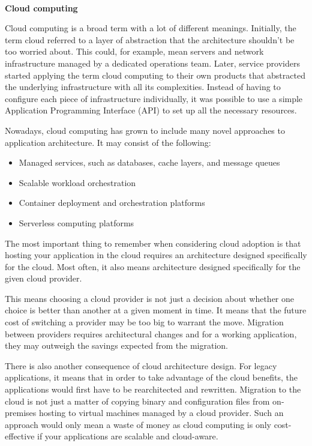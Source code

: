\hspace*{\fill} \\ %
\noindent
\textbf{Cloud computing}

Cloud computing is a broad term with a lot of different meanings. Initially, the term cloud referred to a layer of abstraction that the architecture shouldn't be too worried about. This could, for example, mean servers and network infrastructure managed by a dedicated operations team. Later, service providers started applying the term cloud computing to their own products that abstracted the underlying infrastructure with all its complexities. Instead of having to configure each piece of infrastructure individually, it was possible to use a simple Application Programming Interface (API) to set up all the necessary resources.

Nowadays, cloud computing has grown to include many novel approaches to application architecture. It may consist of the following:

\begin{itemize}
\item 
Managed services, such as databases, cache layers, and message queues

\item 
Scalable workload orchestration

\item 
Container deployment and orchestration platforms

\item 
Serverless computing platforms
\end{itemize}

The most important thing to remember when considering cloud adoption is that hosting your application in the cloud requires an architecture designed specifically for the cloud. Most often, it also means architecture designed specifically for the given cloud provider.

This means choosing a cloud provider is not just a decision about whether one choice is better than another at a given moment in time. It means that the future cost of switching a provider may be too big to warrant the move. Migration between providers requires architectural changes and for a working application, they may outweigh the savings expected from the migration.

There is also another consequence of cloud architecture design. For legacy applications, it means that in order to take advantage of the cloud benefits, the applications would first have to be rearchitected and rewritten. Migration to the cloud is not just a matter of copying binary and configuration files from on-premises hosting to virtual machines managed by a cloud provider. Such an approach would only mean a waste of money as cloud computing is only cost-effective if your applications are scalable and cloud-aware.

